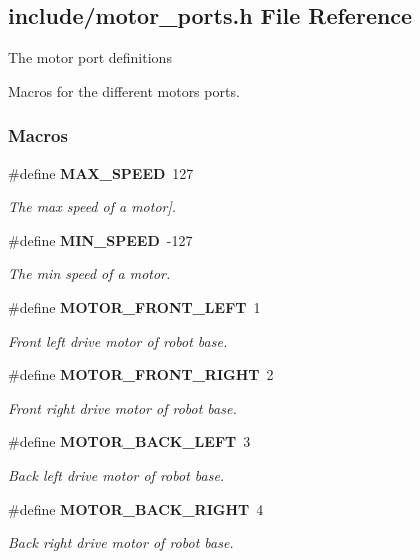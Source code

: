 \subsection{include/motor\+\_\+ports.h File Reference}
\label{motor__ports_8h}


The motor port definitions

Macros for the different motors ports.  


\subsubsection*{Macros}
\begin{DoxyCompactItemize}
\item 
\#define \textbf{ M\+A\+X\+\_\+\+S\+P\+E\+ED}~127
\begin{DoxyCompactList}\small\item\em The max speed of a motor]. \end{DoxyCompactList}\item 
\#define \textbf{ M\+I\+N\+\_\+\+S\+P\+E\+ED}~-\/127
\begin{DoxyCompactList}\small\item\em The min speed of a motor. \end{DoxyCompactList}\item 
\#define \textbf{ M\+O\+T\+O\+R\+\_\+\+F\+R\+O\+N\+T\+\_\+\+L\+E\+FT}~1
\begin{DoxyCompactList}\small\item\em Front left drive motor of robot base. \end{DoxyCompactList}\item 
\#define \textbf{ M\+O\+T\+O\+R\+\_\+\+F\+R\+O\+N\+T\+\_\+\+R\+I\+G\+HT}~2
\begin{DoxyCompactList}\small\item\em Front right drive motor of robot base. \end{DoxyCompactList}\item 
\#define \textbf{ M\+O\+T\+O\+R\+\_\+\+B\+A\+C\+K\+\_\+\+L\+E\+FT}~3
\begin{DoxyCompactList}\small\item\em Back left drive motor of robot base. \end{DoxyCompactList}\item 
\#define \textbf{ M\+O\+T\+O\+R\+\_\+\+B\+A\+C\+K\+\_\+\+R\+I\+G\+HT}~4
\begin{DoxyCompactList}\small\item\em Back right drive motor of robot base. \end{DoxyCompactList}\item 

\end{DoxyCompactItemize}
